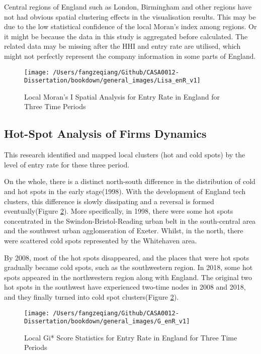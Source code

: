 \documentclass[
  12pt,
  oneside]{book}
\begin{document}
Central regions of England such as London, Birmingham and other regions have not had obvious spatial clustering effects in the visualisation results. This may be due to the low statistical confidence of the local Moran's index among regions. Or it might be because the data in this study is aggregated before calculated. The related data may be missing after the HHI and entry rate are utilised, which might not perfectly represent the company information in some parts of England.

\begin{figure}
\texttt{[image: /Users/fangzeqiang/Github/CASA0012-Dissertation/bookdown/general\_images/Lisa\_enR\_v1]} \caption{Local Moran's I Spatial Analysis for Entry Rate in England for Three Time Periods}\label{fig:fig-lisa-entry-rate}
\end{figure}

\hypertarget{hot-spot-analysis-of-firms-dynamics}{%
\subsection{Hot-Spot Analysis of Firms Dynamics}\label{hot-spot-analysis-of-firms-dynamics}}

This research identified and mapped local clusters (hot and cold spots) by the level of entry rate for these three period.

On the whole, there is a distinct north-south difference in the distribution of cold and hot spots in the early stage(1998). With the development of England tech clusters, this difference is slowly dissipating and a reversal is formed eventually(Figure \ref{fig:fig-Gi-entry-rate}). More specifically, in 1998, there were some hot spots concentrated in the Swindon-Bristol-Reading urban belt in the south-central area and the southwest urban agglomeration of Exeter. Whilst, in the north, there were scattered cold spots represented by the Whitehaven area.

By 2008, most of the hot spots disappeared, and the places that were hot spots gradually became cold spots, such as the southwestern region. In 2018, some hot spots appeared in the northwestern region along with England. The original two hot spots in the southwest have experienced two-time nodes in 2008 and 2018, and they finally turned into cold spot clusters(Figure \ref{fig:fig-Gi-entry-rate}).

\begin{figure}
\texttt{[image: /Users/fangzeqiang/Github/CASA0012-Dissertation/bookdown/general\_images/G\_enR\_v1]} \caption{Local Gi* Score Statistics for Entry Rate in England for Three Time Periods}\label{fig:fig-Gi-entry-rate}
\end{figure}
\end{document}
